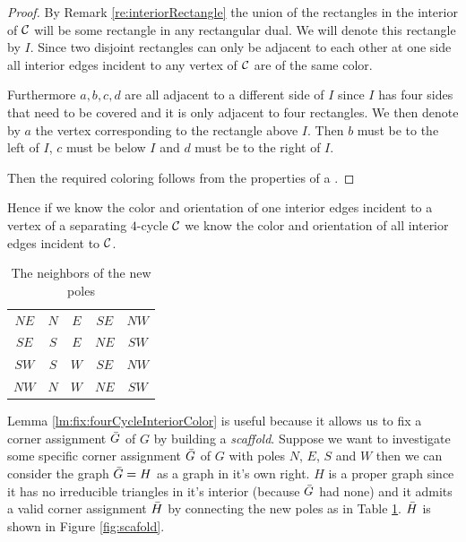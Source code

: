   \begin{proof}
  By Remark \ref{re:interiorRectangle} the union of the rectangles in the interior of $\mathcal{C}$ will be some rectangle in any rectangular dual. We will denote this rectangle by $I$. Since two disjoint rectangles can only be adjacent to each other at one side all interior edges incident to any vertex of $\mathcal{C}$ are of the same color.

  Furthermore $a, b, c, d$ are all adjacent to a different side of $I$ since $I$ has four sides that need to be covered and it is only adjacent to four rectangles. We then denote by $a$ the vertex corresponding to the rectangle above $I$. Then $b$ must be to the left of $I$, $c$ must be below $I$ and $d$ must be to the right of $I$.

  Then the required coloring follows from the properties of a \rel.

  \end{proof}

  Hence if we know the color and orientation of one interior edges incident to a vertex of a separating $4$-cycle $\mathcal{C}$ we know the color and orientation of all interior edges incident to $\mathcal{C}$.


  \begin{table}
    \centering
    \begin{tabular}{c|| c c c c}
      $NE$ & $N$ & $ E$ & $ SE$ & $ NW$ \\
      $SE$ & $S$ & $ E$ & $ NE$ & $ SW$\\
      $SW$ & $S$ & $ W$ & $ SE$ & $ NW$\\
      $NW$ & $N$ & $ W$ & $ NE$ & $ SW$\\
    \end{tabular}
    \caption{The neighbors of the new poles}
    \label{tab:scaffold}
  \end{table}

  Lemma \ref{lm:fix:fourCycleInteriorColor} is useful because it allows us to fix a corner assignment $\bar{G}$ of $G$ by building a \emph{scaffold}. Suppose we want to investigate some specific corner assignment $\bar{G}$ of $G$ with poles $N$, $E$, $S$ and $W$ then we can consider the graph $\bar{G} = H$ as a graph in it's own right. $H$ is a proper graph since it has no irreducible triangles in it's interior (because $\bar{G}$ had none) and it admits a valid corner assignment $\bar{H}$ by connecting the new poles as in Table \ref{tab:scaffold}. $\bar{H}$ is shown in Figure \ref{fig:scafold}.

